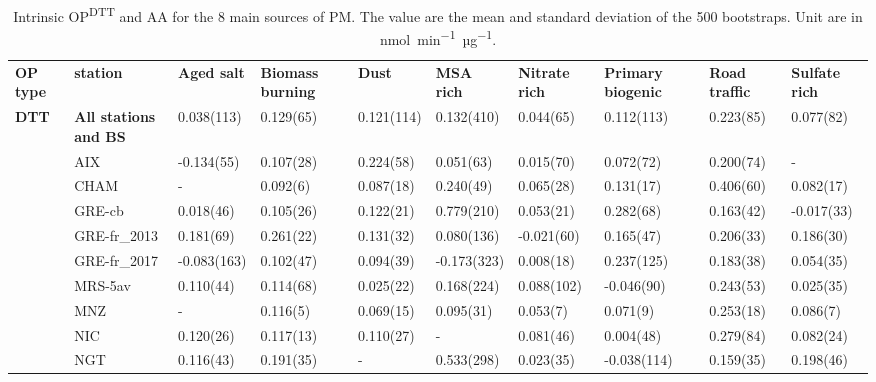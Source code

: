 \documentclass[acp]{copernicus}
\newcommand{\uOPm}{\unit{nmol~min^{-1}~µg^{-1}}}
\begin{document}
\begin{table}
    \caption{
        Intrinsic OP\textsuperscript{DTT} and AA for the 8 main sources of PM. The value
        are the mean and standard deviation of the 500 bootstraps. Unit are in
        \uOPm.
    }
    \label{tab:tab3}
    \begin{tabular}{llllllllll}
\tophline
\textbf{OP type} & \textbf{station}             & \textbf{Aged salt} & \textbf{Biomass burning} & \textbf{Dust} & \textbf{MSA rich} & \textbf{Nitrate rich} & \textbf{Primary biogenic} & \textbf{Road traffic} & \textbf{Sulfate rich}\\
\middlehline
\textbf{DTT}     & \textbf{All stations and BS} & 0.038(113)  & 0.129(65)  & 0.121(114) & 0.132(410)  & 0.044(65)  & 0.112(113)  & 0.223(85)  & 0.077(82)\\
                 & AIX                          & -0.134(55)  & 0.107(28)  & 0.224(58)  & 0.051(63)   & 0.015(70)  & 0.072(72)   & 0.200(74)  & -\\
                 & CHAM                         & -           & 0.092(6)   & 0.087(18)  & 0.240(49)   & 0.065(28)  & 0.131(17)   & 0.406(60)  & 0.082(17)\\
                 & GRE-cb                       & 0.018(46)   & 0.105(26)  & 0.122(21)  & 0.779(210)  & 0.053(21)  & 0.282(68)   & 0.163(42)  & -0.017(33)\\
                 & GRE-fr\_2013                 & 0.181(69)   & 0.261(22)  & 0.131(32)  & 0.080(136)  & -0.021(60) & 0.165(47)   & 0.206(33)  & 0.186(30)\\
                 & GRE-fr\_2017                 & -0.083(163) & 0.102(47)  & 0.094(39)  & -0.173(323) & 0.008(18)  & 0.237(125)  & 0.183(38)  & 0.054(35)\\
                 & MRS-5av                      & 0.110(44)   & 0.114(68)  & 0.025(22)  & 0.168(224)  & 0.088(102) & -0.046(90)  & 0.243(53)  & 0.025(35)\\
                 & MNZ                          & -           & 0.116(5)   & 0.069(15)  & 0.095(31)   & 0.053(7)   & 0.071(9)    & 0.253(18)  & 0.086(7)\\
                 & NIC                          & 0.120(26)   & 0.117(13)  & 0.110(27)  & -           & 0.081(46)  & 0.004(48)   & 0.279(84)  & 0.082(24)\\
                 & NGT                          & 0.116(43)   & 0.191(35)  & -          & 0.533(298)  & 0.023(35)  & -0.038(114) & 0.159(35)  & 0.198(46)\\

\end{tabular}
\end{table}
\end{document}
